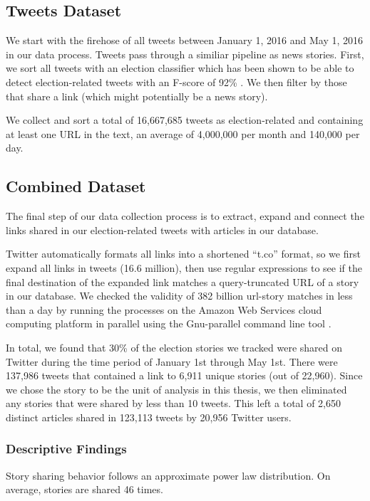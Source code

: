 \documentclass[letterpaper]{article}
\begin{document}
\subsection{Tweets Dataset}
We start with the firehose of all tweets between January 1, 2016 and May 1, 2016 in our data process. Tweets pass through a similiar pipeline as news stories. First, we sort all tweets with an election classifier which has been shown to be able to detect election-related tweets with an F-score of 92\% \cite{vvr_electome2016}. We then filter by those that share a link (which might potentially be a news story). 

We collect and sort a total of 16,667,685 tweets as election-related and containing at least one URL in the text, an average of 4,000,000 per month and 140,000 per day.

\subsection{Combined Dataset}
The final step of our data collection process is to extract, expand and connect the links shared in our election-related tweets with articles in our database.
 
Twitter automatically formats all links into a shortened ``t.co'' format, so we first expand all links in tweets (16.6 million), then use regular expressions to see if the final destination of the expanded link matches a query-truncated URL of a story in our database. We checked the validity of 382 billion url-story matches in less than a day by running the processes on the Amazon Web Services cloud computing platform in parallel using the Gnu-parallel command line tool \cite{tange2011gnu}.

In total, we found that 30\% of the election stories we tracked were shared on Twitter during the time period of January 1st through May 1st. There were 137,986 tweets that contained a link to 6,911 unique stories (out of 22,960). Since we chose the story to be the unit of analysis in this thesis, we then eliminated any stories that were shared by less than 10 tweets. This left a total of 2,650 distinct articles shared in 123,113 tweets by 20,956 Twitter users.

\subsubsection{Descriptive Findings}
Story sharing behavior follows an approximate power law distribution. On average, stories are shared 46 times.
\end{document}
